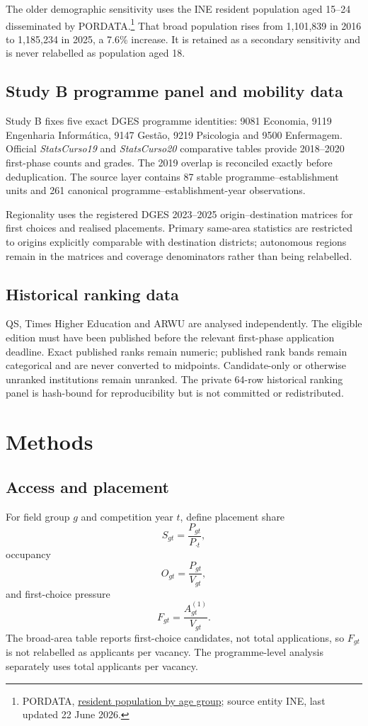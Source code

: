 \documentclass[11pt,a4paper]{article}
\begin{document}
The older demographic sensitivity uses the INE resident population aged 15--24 disseminated by PORDATA.\footnote{PORDATA, \href{https://www.pordata.pt/en/portugal/resident+population+of+working+age+total+and+by+age+group-3245}{resident population by age group}; source entity INE, last updated 22 June 2026.} That broad population rises from 1,101,839 in 2016 to 1,185,234 in 2025, a 7.6\% increase. It is retained as a secondary sensitivity and is never relabelled as population aged 18.

\subsection{Study B programme panel and mobility data}
Study B fixes five exact DGES programme identities: 9081 Economia, 9119 Engenharia Informática, 9147 Gestão, 9219 Psicologia and 9500 Enfermagem. Official \emph{StatsCurso19} and \emph{StatsCurso20} comparative tables provide 2018--2020 first-phase counts and grades. The 2019 overlap is reconciled exactly before deduplication. The source layer contains 87 stable programme--establishment units and 261 canonical programme--establishment-year observations.

Regionality uses the registered DGES 2023--2025 origin--destination matrices for first choices and realised placements. Primary same-area statistics are restricted to origins explicitly comparable with destination districts; autonomous regions remain in the matrices and coverage denominators rather than being relabelled.

\subsection{Historical ranking data}
QS, Times Higher Education and ARWU are analysed independently. The eligible edition must have been published before the relevant first-phase application deadline. Exact published ranks remain numeric; published rank bands remain categorical and are never converted to midpoints. Candidate-only or otherwise unranked institutions remain unranked. The private 64-row historical ranking panel is hash-bound for reproducibility but is not committed or redistributed.

\section{Methods}
\subsection{Access and placement}
For field group $g$ and competition year $t$, define placement share
\[
S_{gt}=\frac{P_{gt}}{P_{\cdot t}},
\]
occupancy
\[
O_{gt}=\frac{P_{gt}}{V_{gt}},
\]
and first-choice pressure
\[
F_{gt}=\frac{A^{(1)}_{gt}}{V_{gt}}.
\]
The broad-area table reports first-choice candidates, not total applications, so $F_{gt}$ is not relabelled as applicants per vacancy. The programme-level analysis separately uses total applicants per vacancy.
\end{document}
